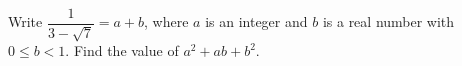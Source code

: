Write $\dfrac{1}{3-\sqrt7}=a+b$, where $a$ is an integer and $b$ is a real number with $0\le b<1$. Find the value of $a^2+ab+b^2$.
